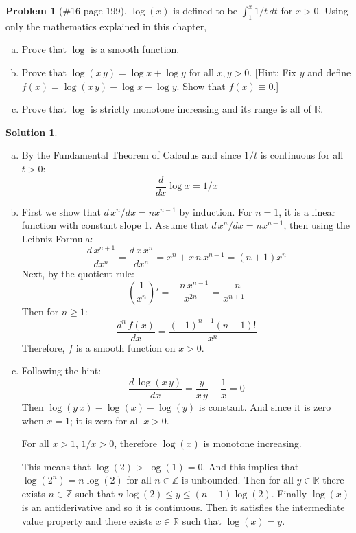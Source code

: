 \documentclass{article}
\theoremstyle{definition}
\newtheorem*{soln}{Solution}
\newtheorem*{prob}{Problem}
\theoremstyle{theorem}
\newcommand{\R}{\mathbb{R}}
\newcommand{\Z}{\mathbb{Z}}
\begin{document}
\begin{prob}[\#16 page 199]
    $\log(x)$ is defined to be $\int_1^x 1/t\, dt$ for $x>0$. Using only the mathematics explained in this chapter,
    \begin{enumerate}[(a)]
        \item Prove that $\log$ is a smooth function.
        \item Prove that $\log(x\,y) = \log x + \log y$ for all $x,y>0$. [Hint: Fix $y$ and define $f(x) = \log(x\, y) - \log x - \log y$. Show that $f(x) \equiv 0$.]
        \item Prove that $\log$ is strictly monotone increasing and its range is all of $\R$.
    \end{enumerate}
\end{prob}
\begin{soln}
    \begin{enumerate}[(a)]
        \item By the Fundamental Theorem of Calculus and since $1/t$ is continuous for all $t> 0$:
            $$\frac d{dx} \log x = 1/x$$

        \item First we show that $d\, x^n/dx = n x^{n-1 }$ by induction. For $n=1$, it is a linear function with constant slope 1. Assume that $d\, x^n/dx = n x^{n-1 }$, then using the Leibniz Formula:
            $$\frac{d\, x^{n+1}}{dx^n} = \frac{d\, x\, x^{n}}{dx^n} = x^n + x \, n\,x^{n-1 } = (n+1)x^n$$
            Next,  by the quotient rule:
            $$\left(\frac 1{x^n}\right)' = \frac{-n\,x^{n-1 }}{x^{2n }}= \frac{-n}{x^{n+1 }}$$
            Then for $n\geq 1$:
            $$\frac{d^{n }\, f(x)}{dx} = \frac{(-1)^{n+1 }(n-1)!}{x^n}$$
            Therefore, $f$ is a smooth function on $x>0$.
        \item Following the hint:
            $$\frac{d\, \log(x\,y)}{dx} = \frac y{x\, y} - \frac 1x = 0$$
            Then $\log (y\,x)- \log(x) -\log(y)$ is constant. And since it is zero when $x=1$; it is zero for all $x> 0$.

        For all $x> 1$, $1/x>0$, therefore $\log(x)$ is monotone increasing. 

            This means that $\log(2)>\log(1)=0$. And this implies that $\log(2^n) = n\log(2)$ for all $n\in\Z$ is unbounded. Then for all $y\in  \R$ there exists $n\in \Z$ such that $n\log(2) \leq y \leq (n+1)\log(2)$. Finally $\log(x)$ is an antiderivative and so it is continuous. Then it satisfies the intermediate value property and there exists $x\in \R$ such that $\log(x)=y$.

    \end{enumerate}
 
\end{soln}
\vspace{1in}
\end{document}

